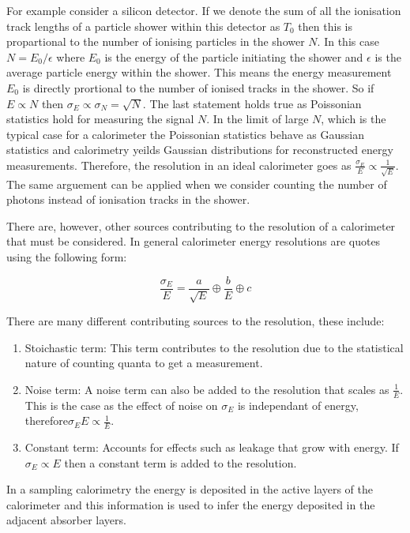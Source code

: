 For example consider a silicon detector.  If we denote the sum of all the ionisation track lengths of a particle shower within this detector as $T_{0}$ then this is propartional to the number of ionising particles in the shower $N$.  In this case $N = E_{0}/\epsilon$ where $E_{0}$ is the energy of the particle initiating the shower and $\epsilon$ is the average particle energy within the shower.  This means the energy measurement $E_{0}$ is directly prortional to the number of ionised tracks in the shower.  So if $E \propto N$ then $\sigma_{E} \propto \sigma_{N} = \sqrt{N}$.  The last statement holds true as Poissonian statistics hold for measuring the signal $N$.  In the limit of large $N$, which is the typical case for a calorimeter the Poissonian statistics behave as Gaussian statistics and calorimetry yeilds Gaussian distributions for reconstructed energy measurements.  Therefore, the resolution in an ideal calorimeter goes as $\frac{\sigma_{E}}{E} \propto \frac{1}{\sqrt{E}}$.  The same arguement can be applied when we consider counting the number of photons instead of ionisation tracks in the shower.

There are, however, other sources contributing to the resolution of a calorimeter that must be considered.  In general calorimeter energy resolutions are quotes using the following form:

\begin{equation}
\frac{\sigma_{E}}{E} = \frac{a}{\sqrt{E}} \oplus \frac{b}{E} \oplus c
\end{equation}

There are many different contributing sources to the resolution, these include:
\begin{enumerate}
\item Stoichastic term:  This term contributes to the resolution due to the statistical nature of counting quanta to get a measurement.
\item Noise term:  A noise term can also be added to the resolution that scales as $\frac{1}{E}$.  This is the case as the effect of noise on $\sigma_{E}$ is independant of energy, therefore$\sigma_{E}{E} \propto \frac{1}{E}$.
\item Constant term:  Accounts for effects such as leakage that grow with energy.  If $\sigma_{E} \propto E$ then a constant term is added to the resolution.
\end{enumerate}

In a sampling calorimetry the energy is deposited in the active layers of the calorimeter and this information is used to infer the energy deposited in the adjacent absorber layers.







